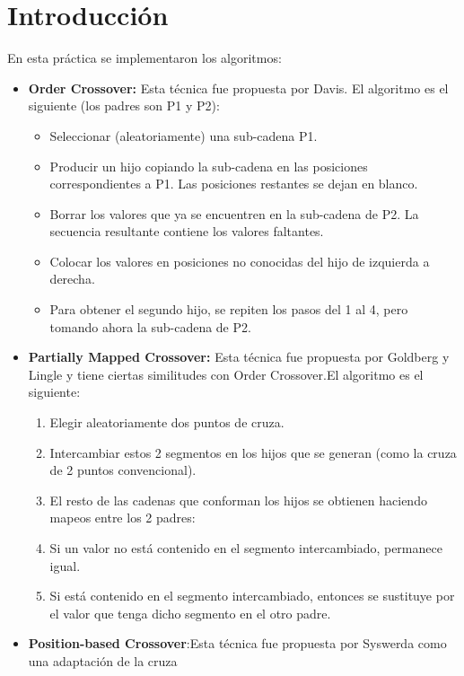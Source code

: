 \documentclass{article}
\begin{document}
\maketitle
\tableofcontents
\section{Introducción}
En esta práctica se implementaron los algoritmos:
\begin{itemize}
	\item \textbf{Order Crossover:} Esta técnica fue propuesta por Davis. El algoritmo es el siguiente (los padres
son P1 y P2):
	\begin{itemize}
		\item  Seleccionar (aleatoriamente) una sub-cadena P1.
		\item  Producir un hijo copiando la sub-cadena en las posiciones correspondientes
a P1. Las posiciones restantes se dejan en blanco.
		\item  Borrar los valores que ya se encuentren en la sub-cadena de P2. La secuencia resultante contiene los valores faltantes.
		\item  Colocar los valores en posiciones no conocidas del hijo de izquierda a
derecha.
		\item  Para obtener el segundo hijo, se repiten los pasos del 1 al 4, pero tomando
ahora la sub-cadena de P2.
	\end{itemize}
	\item \textbf{Partially Mapped Crossover:} Esta técnica fue propuesta por Goldberg y Lingle y tiene ciertas similitudes
	con Order Crossover.El algoritmo es el siguiente:
	\begin{enumerate}
		\item Elegir aleatoriamente dos puntos de cruza.
		\item Intercambiar estos 2 segmentos en los hijos que se generan (como la cruza
de 2 puntos convencional).
		\item El resto de las cadenas que conforman los hijos se obtienen haciendo mapeos
entre los 2 padres:
		\item Si un valor no está contenido en el segmento intercambiado, permanece
igual.
		\item Si está contenido en el segmento intercambiado, entonces se sustituye
por el valor que tenga dicho segmento en el otro padre.
	\end{enumerate}
	\item \textbf{Position-based Crossover}:Esta técnica fue propuesta por Syswerda como una adaptación de la cruza

\end{itemize}
\end{document}
